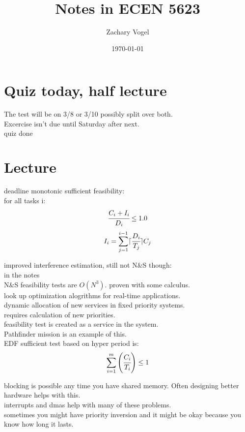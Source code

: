 \documentclass{article}
\author{Zachary Vogel}
\date{\today}
\title{Notes in ECEN 5623}
\begin{document}
\maketitle


\section*{Quiz today, half lecture}
The test will be on 3/8 or 3/10 possibly split over both.\\
Excercise isn't due until Saturday after next.\\
quiz done

\section*{Lecture}
deadline monotonic sufficient feasibility:\\
for all tasks i:
\[\cfrac{C_i+I_i}{D_i}\leq 1.0\]
\[I_i=\sum_{j=1}^{i-1}\lceil \cfrac{D_i}{T_j}\rceil C_j\]

improved interference estimation, still not N\&S though:\\
in the notes\\
N\&S feasibility tests are $O(N^3)$. proven with some calculus.\\

look up optimization alogrithms for real-time applications.\\

dynamic allocation of new services in fixed priority systems.\\
requires calculation of new priorities.\\

feasibility test is created as a service in the system.\\

Pathfinder mission is an example of this.\\

EDF sufficient test based on hyper period is:
\[\sum_{i=1}^m \left (\cfrac{C_i}{T_i}\right )\leq 1\]

blocking is possible any time you have shared memory. Often designing better hardware helps with this.\\
interrupts and dmas help with many of these problems.\\

sometimes you might have priority inversion and it might be okay because you know how long it lasts.\\
\end{document}
